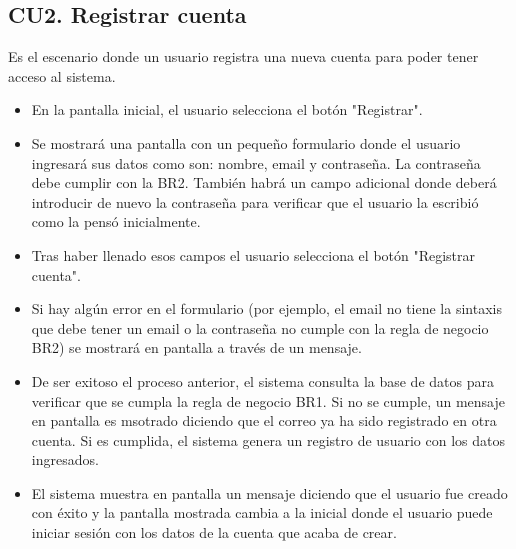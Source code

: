 \subsection{CU2. Registrar cuenta} \par
Es el escenario donde un usuario registra una nueva cuenta para poder tener acceso al sistema.
\begin{itemize}
	\item En la pantalla inicial, el usuario selecciona el botón "Registrar".
	\item Se mostrará una pantalla con un pequeño formulario donde el usuario ingresará sus datos como son: nombre, email y contraseña. La contraseña debe cumplir con la BR2. También habrá un campo adicional donde deberá introducir de nuevo la contraseña para verificar que el usuario la escribió como la pensó inicialmente.
	\item Tras haber llenado esos campos el usuario selecciona el botón "Registrar cuenta".
	\item Si hay algún error en el formulario (por ejemplo, el email no tiene la sintaxis que debe tener un email o la contraseña no cumple con la regla de negocio BR2) se mostrará en pantalla a través de un mensaje.
	\item De ser exitoso el proceso anterior, el sistema consulta la base de datos para verificar que se cumpla la regla de negocio BR1. Si no se cumple, un mensaje en pantalla es msotrado diciendo que el correo ya ha sido registrado en otra cuenta. Si es cumplida, el sistema genera un registro de usuario con los datos ingresados.
	\item El sistema muestra en pantalla un mensaje diciendo que el usuario fue creado con éxito y la pantalla mostrada cambia a la inicial donde el usuario puede iniciar sesión con los datos de la cuenta que acaba de crear.
\end{itemize}
\newpage
